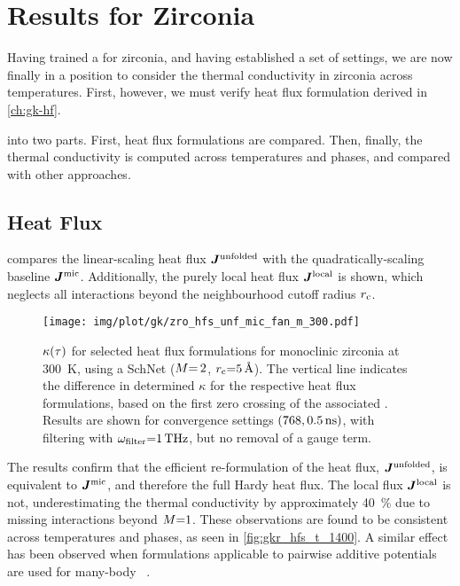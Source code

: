 
\chapter{Results for Zirconia}
\label{ch:gk-res}

Having trained a \glp for zirconia, and having established a set of \gk settings, we are now finally in a position to consider the thermal conductivity in zirconia across temperatures. First, however, we must verify heat flux formulation derived in \cref{ch:gk-hf}.

 into two parts. First, heat flux formulations are compared. Then, finally, the thermal conductivity is computed across temperatures and phases, and compared with other approaches.

\section{Heat Flux}

{} compares the linear-scaling  heat flux $\boldsymbol{J}^{\text{unfolded}}$ with the quadratically-scaling baseline $\boldsymbol{J}^{\text{mic}}$.
Additionally, the purely local heat flux $\boldsymbol{J}^{\text{local}}$ is shown, which neglects all interactions beyond the neighbourhood cutoff radius $r_{\text{c}}$.

\begin{figure}
  \texttt{[image: img/plot/gk/zro\_hfs\_unf\_mic\_fan\_m\_300.pdf]}
  \caption{
  $\kappa(\tau)$ for selected heat flux formulations for monoclinic zirconia at \qty{300}{K},
  using a SchNet \glp ($M{=\,}2$, $r_{\text{c}}{=}\qty{5}{\angstrom}$).
  The vertical line indicates the difference in determined $\kappa$ for the respective heat flux formulations, based on the first zero crossing of the associated \hfacf.
  Results are shown for  convergence settings $(768, \qty{0.5}{ns})$, with filtering with $\omega_{\text{filter}}{=}\qty{1}{THz}$, but no removal of a gauge term.
  }
  \label{fig:gkr_hfs_m_300}
\end{figure}

The results confirm that the efficient re-formulation of the heat flux, $\boldsymbol{J}^{\text{unfolded}}$, is equivalent to $\boldsymbol{J}^{\text{mic}}$, and therefore the full Hardy heat flux.
The local flux $\boldsymbol{J}^{\text{local}}$ is not, underestimating the thermal conductivity by approximately \qty{40}{\percent} due to missing interactions beyond $M{=}1$.
These observations are found to be consistent across temperatures and phases, as seen in \cref{fig:gkr_hfs_t_1400}.
A similar effect has been observed when formulations applicable to pairwise additive potentials are used for many-body \ffs~\cite{bbw2019t,smko2019t}.


